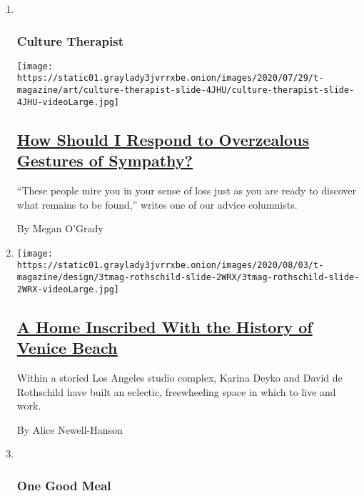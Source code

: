\begin{enumerate}
\def\labelenumi{\arabic{enumi}.}
\item ~
  \hypertarget{culture-therapist}{%
  \subsubsection{Culture Therapist}\label{culture-therapist}}

  \texttt{[image: https://static01.graylady3jvrrxbe.onion/images/2020/07/29/t-magazine/art/culture-therapist-slide-4JHU/culture-therapist-slide-4JHU-videoLarge.jpg]}

  \hypertarget{how-should-i-respond-to-overzealous-gestures-of-sympathy}{%
  \subsection{\texorpdfstring{\href{/2020/07/31/t-magazine/culture-therapist-grief.html}{How
  Should I Respond to Overzealous Gestures of
  Sympathy?}}{How Should I Respond to Overzealous Gestures of Sympathy?}}\label{how-should-i-respond-to-overzealous-gestures-of-sympathy}}

  ``These people mire you in your sense of loss just as you are ready to
  discover what remains to be found,'' writes one of our advice
  columnists.

  By Megan O'Grady
\item
  \texttt{[image: https://static01.graylady3jvrrxbe.onion/images/2020/08/03/t-magazine/design/3tmag-rothschild-slide-2WRX/3tmag-rothschild-slide-2WRX-videoLarge.jpg]}

  \hypertarget{a-home-inscribed-with-the-history-of-venice-beach}{%
  \subsection{\texorpdfstring{\href{/2020/08/03/t-magazine/david-de-rothschild-venice-home-design.html}{A
  Home Inscribed With the History of Venice
  Beach}}{A Home Inscribed With the History of Venice Beach}}\label{a-home-inscribed-with-the-history-of-venice-beach}}

  Within a storied Los Angeles studio complex, Karina Deyko and David de
  Rothschild have built an eclectic, freewheeling space in which to live
  and work.

  By Alice Newell-Hanson
\item ~
  \hypertarget{one-good-meal}{%
  \subsubsection{One Good Meal}\label{one-good-meal}}


\end{enumerate}
